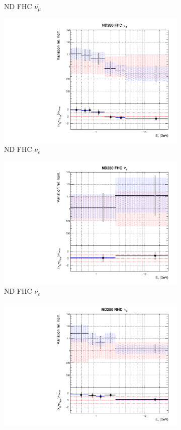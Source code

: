 \begin{figure}
\begin{subfigure}{0.45\textwidth}
  \caption{ND FHC $\bar{\nu_{\mu}}$}
\end{subfigure}
\begin{subfigure}{0.45\textwidth}
  \centering
  \includegraphics[width=0.75\linewidth]{figs/jointflux2}
  \caption{ND FHC $\nu_{e}$}
\end{subfigure}
\begin{subfigure}{0.45\textwidth}
  \centering
  \includegraphics[width=0.75\linewidth]{figs/jointflux3}
  \caption{ND FHC $\bar{\nu_{e}}$}
\end{subfigure}
\begin{subfigure}{0.45\textwidth}
  \centering
  \includegraphics[width=0.75\linewidth]{figs/jointflux4}

\end{subfigure}
\end{figure}
